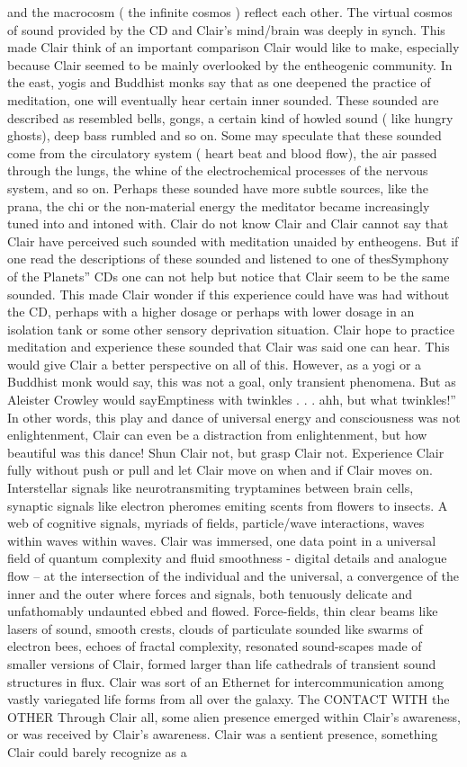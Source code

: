 \documentclass[12pt]{book}
\begin{document}
and the macrocosm ( the infinite cosmos ) reflect each other. The virtual cosmos of sound provided by the CD and Clair's mind/brain was deeply in synch. This made Clair think of an important comparison Clair would like to make, especially because Clair seemed to be mainly overlooked by the entheogenic community. In the east, yogis and Buddhist monks say that as one deepened the practice of meditation, one will eventually hear certain inner sounded. These sounded are described as resembled bells, gongs, a certain kind of howled sound ( like hungry ghosts), deep bass rumbled and so on. Some may speculate that these sounded come from the circulatory system ( heart beat and blood flow), the air passed through the lungs, the whine of the electrochemical processes of the nervous system, and so on. Perhaps these sounded have more subtle sources, like the prana, the chi or the non-material energy the meditator became increasingly tuned into and intoned with. Clair do not know Clair and Clair cannot say that Clair have perceived such sounded with meditation unaided by entheogens. But if one read the descriptions of these sounded and listened to one of thesSymphony of the Planets'' CDs one can not help but notice that Clair seem to be the same sounded. This made Clair wonder if this experience could have was had without the CD, perhaps with a higher dosage or perhaps with lower dosage in an isolation tank or some other sensory deprivation situation. Clair hope to practice meditation and experience these sounded that Clair was said one can hear. This would give Clair a better perspective on all of this. However, as a yogi or a Buddhist monk would say, this was not a goal, only transient phenomena. But as Aleister Crowley would sayEmptiness with twinkles . . .  ahh, but what twinkles!'' In other words, this play and dance of universal energy and consciousness was not enlightenment, Clair can even be a distraction from enlightenment, but how beautiful was this dance! Shun Clair not, but grasp Clair not. Experience Clair fully without push or pull and let Clair move on when and if Clair moves on. Interstellar signals like neurotransmiting tryptamines between brain cells, synaptic signals like electron pheromes emiting scents from flowers to insects. A web of cognitive signals, myriads of fields, particle/wave interactions, waves within waves within waves. Clair was immersed, one data point in a universal field of quantum complexity and fluid smoothness - digital details and analogue flow -- at the intersection of the individual and the universal, a convergence of the inner and the outer where forces and signals, both tenuously delicate and unfathomably undaunted ebbed and flowed. Force-fields, thin clear beams like lasers of sound, smooth crests, clouds of particulate sounded like swarms of electron bees, echoes of fractal complexity, resonated sound-scapes made of smaller versions of Clair, formed larger than life cathedrals of transient sound structures in flux. Clair was sort of an Ethernet for intercommunication among vastly variegated life forms from all over the galaxy. The CONTACT WITH the OTHER Through Clair all, some alien presence emerged within Clair's awareness, or was received by Clair's awareness. Clair was a sentient presence, something Clair could barely recognize as a 
\end{document}
